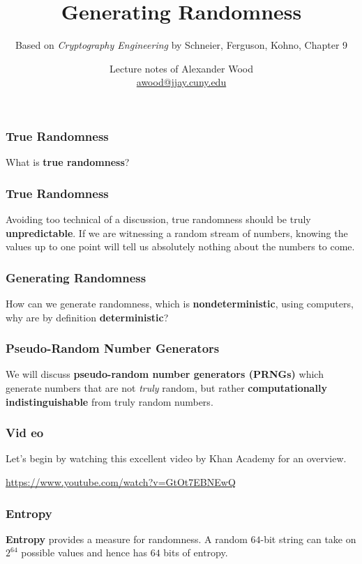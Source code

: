 \documentclass{beamer}
\title[Randomness]{Generating Randomness}
\subtitle{Based on  \emph{Cryptography Engineering} by Schneier, Ferguson, Kohno, Chapter 9}
\author
{Lecture notes of Alexander Wood \\ \scriptsize \href{mailto:awood@jjay.cuny.edu}{awood@jjay.cuny.edu}}
\institute[JJay]{John Jay College of Criminal Justice}
\date{}
\newcommand{\<}{\langle}
\renewcommand{\>}{\rangle}
\begin{document}

\begin{frame}
  \titlepage
\end{frame}


\begin{frame}
\frametitle{True Randomness}

What is \textbf{true randomness}? 
\end{frame}

\begin{frame}
\frametitle{True Randomness}

Avoiding too technical of a discussion, true randomness should be truly \textbf{unpredictable}. If we are witnessing a random stream of numbers, knowing the values up to one point will tell us absolutely nothing about the numbers to come. 
\end{frame}

\begin{frame}
\frametitle{Generating Randomness}

How can we generate randomness, which is \textbf{nondeterministic}, using computers, why are by definition \textbf{deterministic}?
\end{frame}

\begin{frame}
\frametitle{Pseudo-Random Number Generators}

We will discuss \textbf{pseudo-random number generators (PRNGs)} which generate numbers that are not \emph{truly} random, but rather \textbf{computationally indistinguishable} from truly random numbers.
\end{frame}

\begin{frame}
\frametitle{Vid eo}

Let's begin by watching this excellent video by Khan Academy for an overview.\newline

\url{https://www.youtube.com/watch?v=GtOt7EBNEwQ}
\end{frame}

\begin{frame}[fragile]
\frametitle{Entropy}

\textbf{Entropy} provides a measure for randomness. A random $64$-bit string can take on $2^{64}$ possible values and hence has $64$ bits of entropy. \newline
\end{frame}
\end{document}
